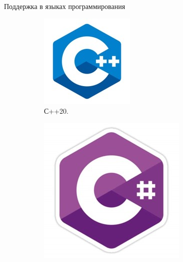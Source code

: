 \begin{frame}{Поддержка в языках программирования}
	
	\begin{figure}
	\centering
	\hfill
	\begin{subfigure}[b]{0.30\linewidth}
		\includegraphics[width=\linewidth, scale=0.35]{images/cpp.jpg}
		\caption{С++20.}
	\end{subfigure}
	\hfill
	\begin{subfigure}[b]{0.24\linewidth}
		\includegraphics[width=\linewidth, scale=0.24]{images/csharp.jpg} 

\end{subfigure}
\end{figure}
\end{frame}
